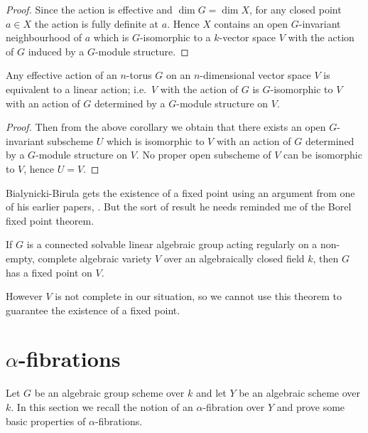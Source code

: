 \documentclass[12pt]{article}
\begin{document}
\begin{proof}
Since the action is effective and $\dim G = \dim X$, for any closed point 
$a \in X$ the action is fully definite at $a$. Hence $X$ contains an open 
$G$-invariant neighbourhood of $a$ which is $G$-isomorphic to a $k$-vector 
space $V$ with the action of $G$ induced by a $G$-module structure.
\end{proof}

\begin{corollary}
Any effective action of an $n$-torus $G$ on an 
$n$-dimensional vector space $V$ is equivalent to a linear action; 
i.e.\ $V$ with the action of $G$ is $G$-isomorphic to $V$ with an action 
of $G$ determined by a $G$-module structure on $V$.
\end{corollary}

\begin{proof}
Then from the above corollary we obtain that there exists an open 
$G$-invariant subscheme $U$ which is isomorphic to $V$ with an action of $G$ 
determined by a $G$-module structure on $V$. No proper open subscheme of $V$ 
can be isomorphic to $V$, hence $U = V$.
\end{proof}

\begin{remark}
   Bialynicki-Birula gets the existence of a fixed point using an argument from one of his earlier papers, . But the sort of result he needs reminded me of the Borel fixed point theorem.
\begin{adjustwidth}{2em}{0pt}
   \vspace{-\parskip} %
   \vspace{-16pt}
\begin{theorem}
If $G$ is a connected solvable linear algebraic group acting regularly on a non-empty, complete algebraic variety $V$ over an algebraically closed field $k$, then $G$ has a fixed point on $V$.
\end{theorem}
\end{adjustwidth}
However $V$ is not complete in our situation, so we cannot use this theorem to guarantee the existence of a fixed point.
\end{remark}
\section{$\alpha$-fibrations}
Let $G$ be an algebraic group scheme over $k$ and let $Y$ be an algebraic scheme over $k$. In this section we recall the notion of an $\alpha$-fibration over $Y$ and prove some basic properties of $\alpha$-fibrations.
\end{document}
